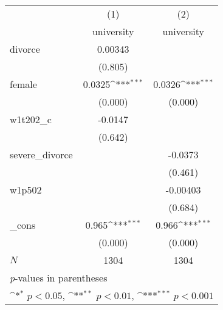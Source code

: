 {
\def\sym#1{\ifmmode^{#1}\else\(^{#1}\)\fi}
\begin{tabular}{l*{2}{c}}
\hline\hline
            &\multicolumn{1}{c}{(1)}&\multicolumn{1}{c}{(2)}\\
            &\multicolumn{1}{c}{university}&\multicolumn{1}{c}{university}\\
\hline
divorce     &     0.00343         &                     \\
            &     (0.805)         &                     \\
[1em]
female      &      0.0325\sym{***}&      0.0326\sym{***}\\
            &     (0.000)         &     (0.000)         \\
[1em]
w1t202\_c    &     -0.0147         &                     \\
            &     (0.642)         &                     \\
[1em]
severe\_divorce&                     &     -0.0373         \\
            &                     &     (0.461)         \\
[1em]
w1p502      &                     &    -0.00403         \\
            &                     &     (0.684)         \\
[1em]
\_cons      &       0.965\sym{***}&       0.966\sym{***}\\
            &     (0.000)         &     (0.000)         \\
\hline
\(N\)       &        1304         &        1304         \\
\hline\hline
\multicolumn{3}{l}{\footnotesize \textit{p}-values in parentheses}\\
\multicolumn{3}{l}{\footnotesize \sym{*} \(p<0.05\), \sym{**} \(p<0.01\), \sym{***} \(p<0.001\)}\\
\end{tabular}
}
